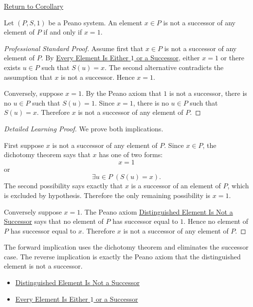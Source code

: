 \newpage
{}
\label{prf:one-is-unique-non-successor}

\begin{remark*}[Return]
\hyperref[cor:one-is-unique-non-successor]{Return to Corollary}
\end{remark*}

\begin{corollary*}
Let $(P,S,1)$ be a Peano system. An element $x \in P$ is not a successor of
any element of $P$ if and only if $x=1$.
\end{corollary*}

\begin{proof}[Professional Standard Proof]
\LRAProofBodyStart
Assume first that $x\in P$ is not a successor of any element of $P$. By
\hyperref[thm:every-element-is-one-or-a-successor]{Every Element Is Either
$1$ or a Successor}, either $x=1$ or there exists $u\in P$ such that
$S(u)=x$. The second alternative contradicts the assumption that $x$ is not a
successor. Hence $x=1$.

Conversely, suppose $x=1$. By the Peano axiom that $1$ is not a successor,
there is no $u\in P$ such that $S(u)=1$. Since $x=1$, there is no $u\in P$
such that $S(u)=x$. Therefore $x$ is not a successor of any element of $P$.
\end{proof}

\begin{proof}[Detailed Learning Proof]
\LRAProofBodyStart
We prove both implications.

First suppose $x$ is not a successor of any element of $P$. Since $x\in P$,
the dichotomy theorem says that $x$ has one of two forms:
\[
x=1
\]
or
\[
\exists u\in P\;(S(u)=x).
\]
The second possibility says exactly that $x$ is a successor of an element of
$P$, which is excluded by hypothesis. Therefore the only remaining
possibility is $x=1$.

Conversely suppose $x=1$. The Peano axiom
\hyperref[ax:peano-base-not-successor]{Distinguished Element Is Not a
Successor} says that no element of $P$ has successor equal to $1$. Hence no
element of $P$ has successor equal to $x$. Therefore $x$ is not a successor
of any element of $P$.
\end{proof}

\begin{remark*}
The forward implication uses the dichotomy theorem and eliminates the
successor case. The reverse implication is exactly the Peano axiom that the
distinguished element is not a successor.
\end{remark*}

\begin{dependencies}
\begin{itemize}
  \item \hyperref[ax:peano-base-not-successor]{Distinguished Element Is Not a Successor}
  \item \hyperref[thm:every-element-is-one-or-a-successor]{Every Element Is Either $1$ or a Successor}
\end{itemize}
\end{dependencies}


\clearpage
